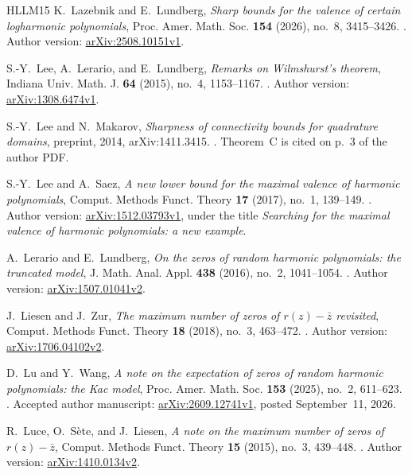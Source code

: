 \documentclass[UTF8,11pt]{ctexart}
\theoremstyle{definition}
\numberwithin{equation}{section}
\begin{document}
\begin{thebibliography}{HLLM15}
K.~Lazebnik and E.~Lundberg,
\emph{Sharp bounds for the valence of certain logharmonic polynomials},
Proc. Amer. Math. Soc. \textbf{154} (2026), no.~8, 3415--3426.
.
Author version: \href{https://arxiv.org/abs/2508.10151v1}{arXiv:2508.10151v1}.

S.-Y.~Lee, A.~Lerario, and E.~Lundberg,
\emph{Remarks on Wilmshurst's theorem},
Indiana Univ. Math. J. \textbf{64} (2015), no.~4, 1153--1167.
.
Author version: \href{https://arxiv.org/abs/1308.6474v1}{arXiv:1308.6474v1}.

S.-Y.~Lee and N.~Makarov,
\emph{Sharpness of connectivity bounds for quadrature domains},
preprint, 2014, arXiv:1411.3415.
.
Theorem~C is cited on p.~3 of the author PDF.

S.-Y.~Lee and A.~Saez,
\emph{A new lower bound for the maximal valence of harmonic polynomials},
Comput. Methods Funct. Theory \textbf{17} (2017), no.~1, 139--149.
.
Author version: \href{https://arxiv.org/abs/1512.03793v1}{arXiv:1512.03793v1},
under the title \emph{Searching for the maximal valence of harmonic
polynomials: a new example}.

A.~Lerario and E.~Lundberg,
\emph{On the zeros of random harmonic polynomials: the truncated model},
J. Math. Anal. Appl. \textbf{438} (2016), no.~2, 1041--1054.
.
Author version: \href{https://arxiv.org/abs/1507.01041v2}{arXiv:1507.01041v2}.

J.~Liesen and J.~Zur,
\emph{The maximum number of zeros of $r(z)-\bar z$ revisited},
Comput. Methods Funct. Theory \textbf{18} (2018), no.~3, 463--472.
.
Author version: \href{https://arxiv.org/abs/1706.04102v2}{arXiv:1706.04102v2}.

D.~Lu and Y.~Wang,
\emph{A note on the expectation of zeros of random harmonic polynomials:
the Kac model},
Proc. Amer. Math. Soc. \textbf{153} (2025), no.~2, 611--623.
.
Accepted author manuscript: \href{https://arxiv.org/abs/2609.12741v1}{arXiv:2609.12741v1},
posted September~11, 2026.

R.~Luce, O.~S\`ete, and J.~Liesen,
\emph{A note on the maximum number of zeros of $r(z)-\bar z$},
Comput. Methods Funct. Theory \textbf{15} (2015), no.~3, 439--448.
.
Author version: \href{https://arxiv.org/abs/1410.0134v2}{arXiv:1410.0134v2}.


\end{thebibliography}
\end{document}
